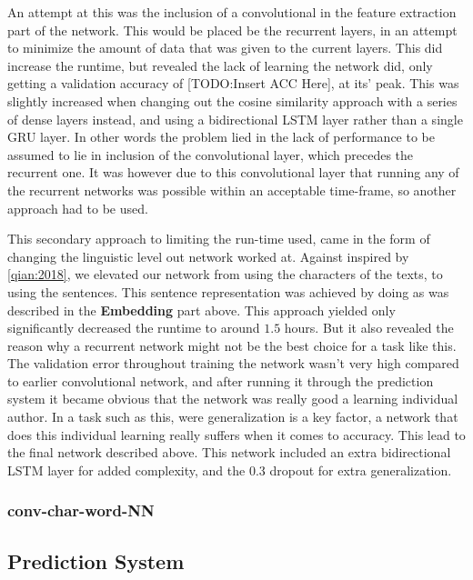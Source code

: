 An attempt at this was the inclusion of a convolutional in the feature
extraction part of the network. This would be placed be the recurrent layers, in
an attempt to minimize the amount of data that was given to the current layers.
This did increase the runtime, but revealed the lack of learning the network
did, only getting a validation accuracy of [TODO:Insert ACC Here], at its' peak.
This was slightly increased when changing out the cosine similarity approach
with a series of dense layers instead, and using a bidirectional \gls{LSTM}
layer rather than a single \gls{GRU} layer. In other words the problem lied in
the lack of performance to be assumed to lie in inclusion of the convolutional
layer, which precedes the recurrent one. It was however due to this convolutional
layer that running any of the recurrent networks was possible within an acceptable
time-frame, so another approach had to be used.

This secondary approach to limiting the run-time used, came in the form of
changing the linguistic level out network worked at. Against inspired by
\ref{qian:2018}, we elevated our network from using the characters of the texts,
to using the sentences. This sentence representation was achieved by doing as
was described in the \textbf{Embedding} part above. This approach yielded only
significantly decreased the runtime to around $1.5$ hours. But it also revealed
the reason why a recurrent network might not be the best choice for a task like
this. The validation error throughout training the network wasn't very high
compared to earlier convolutional network, and after running it through the
prediction system it became obvious that the network was really good a learning
individual author. In a task such as this, were generalization is a key factor,
a network that does this individual learning really suffers when it comes to
accuracy. This lead to the final network described above. This network included 
an extra bidirectional \gls{LSTM} layer for added complexity, and the 0.3
dropout for extra generalization.



\subsubsection{\glsdesc{conv-char-word-NN}}
\label{subsubsec:conv_char_word_nn}


\subsection{Prediction System}

